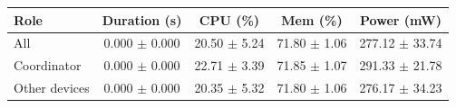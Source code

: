 \begin{tabular}{lcccc}
\hline
\textbf{Role} & \textbf{Duration (s)} & \textbf{CPU (\%)} & \textbf{Mem (\%)} & \textbf{Power (mW)} \\
\hline
All & 0.000 $\pm$ 0.000 & 20.50 $\pm$ 5.24 & 71.80 $\pm$ 1.06 & 277.12 $\pm$ 33.74 \\
Coordinator & 0.000 $\pm$ 0.000 & 22.71 $\pm$ 3.39 & 71.85 $\pm$ 1.07 & 291.33 $\pm$ 21.78 \\
Other devices & 0.000 $\pm$ 0.000 & 20.35 $\pm$ 5.32 & 71.80 $\pm$ 1.06 & 276.17 $\pm$ 34.23 \\
\hline
\end{tabular}
